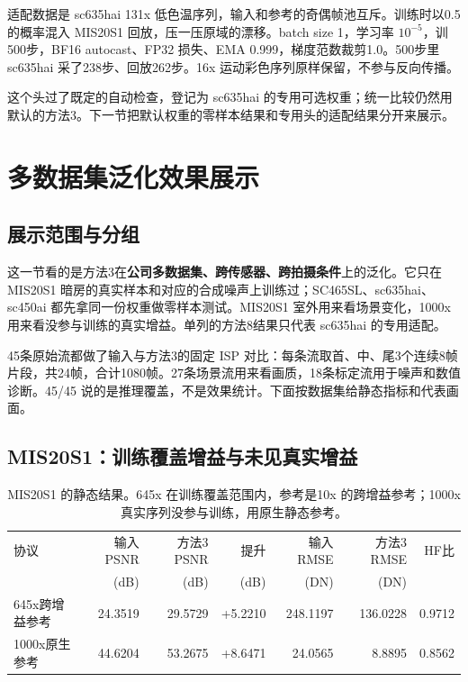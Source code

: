 \documentclass[11pt,a4paper,UTF8,fontset=fandol]{ctexart}
\begin{document}
适配数据是 sc635hai 131x 低色温序列，输入和参考的奇偶帧池互斥。训练时以0.5的概率混入 MIS20S1 回放，压一压原域的漂移。batch size 1，学习率 $10^{-5}$，训500步，BF16 autocast、FP32 损失、EMA 0.999，梯度范数裁剪1.0。500步里 sc635hai 采了238步、回放262步。16x 运动彩色序列原样保留，不参与反向传播。

这个头过了既定的自动检查，登记为 sc635hai 的专用可选权重；统一比较仍然用默认的方法3。下一节把默认权重的零样本结果和专用头的适配结果分开来展示。

\section{多数据集泛化效果展示}
\label{sec:results}

\subsection{展示范围与分组}

这一节看的是方法3在\textbf{公司多数据集、跨传感器、跨拍摄条件}上的泛化。它只在 MIS20S1 暗房的真实样本和对应的合成噪声上训练过；SC465SL、sc635hai、sc450ai 都先拿同一份权重做零样本测试。MIS20S1 室外用来看场景变化，1000x 用来看没参与训练的真实增益。单列的方法8结果只代表 sc635hai 的专用适配。

45条原始流都做了输入与方法3的固定 ISP 对比：每条流取首、中、尾3个连续8帧片段，共24帧，合计1080帧。27条场景流用来看画质，18条标定流用于噪声和数值诊断。45/45 说的是推理覆盖，不是效果统计。下面按数据集给静态指标和代表画面。

\subsection{MIS20S1：训练覆盖增益与未见真实增益}

\begin{table}[!htbp]
\centering\small
\caption{MIS20S1 的静态结果。645x 在训练覆盖范围内，参考是10x 的跨增益参考；1000x 真实序列没参与训练，用原生静态参考。}
\label{tab:mis20s1}
\begin{tabular}{lrrrrrr}
\toprule
协议 & 输入PSNR & 方法3 PSNR & 提升 & 输入RMSE & 方法3 RMSE & HF比 \\
 & (dB) & (dB) & (dB) & (DN) & (DN) & \\
\midrule
645x跨增益参考 & 24.3519 & 29.5729 & +5.2210 & 248.1197 & 136.0228 & 0.9712 \\
1000x原生参考 & 44.6204 & 53.2675 & +8.6471 & 24.0565 & 8.8895 & 0.8562 \\
\bottomrule
\end{tabular}
\end{table}
\end{document}

